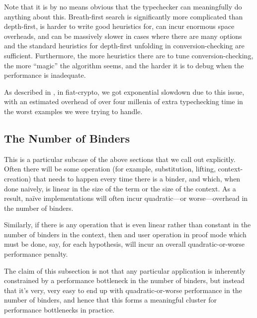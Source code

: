 Note that it is by no means obvious that the typechecker can meaningfully do anything about this.
Breath-first search is significantly more complicated than depth-first, is harder to write good heuristics for, can incur enormous space overheads, and can be massively slower in cases where there are many options and the standard heuristics for depth-first unfolding in conversion-checking are sufficient.
Furthermore, the more heuristics there are to tune conversion-checking, the more ``magic'' the algorithm seems, and the harder it is to debug when the performance is inadequate.

As described in , in fiat-crypto, we got exponential slowdown due to this issue, with an estimated overhead of over four millenia of extra typechecking time in the worst examples we were trying to handle.


\subsection{The Number of Binders} \label{sec:perf:binder-count}

This is a particular subcase of the above sections that we call out explicitly.
Often there will be some operation (for example, substitution, lifting, context-creation) that needs to happen every time there is a binder, and which, when done naively, is linear in the size of the term or the size of the context.
As a result, na\"ive implementations will often incur quadratic---or worse---overhead in the number of binders.


Similarly, if there is any operation that is even linear rather than constant in the number of binders in the context, then and user operation in proof mode which must be done, say, for each hypothesis, will incur an overall quadratic-or-worse performance penalty.

The claim of this subsection is not that any particular application is inherently constrained by a performance bottleneck in the number of binders, but instead that it's very, very easy to end up with quadratic-or-worse performance in the number of binders, and hence that this forms a meaningful cluster for performance bottlenecks in practice.

